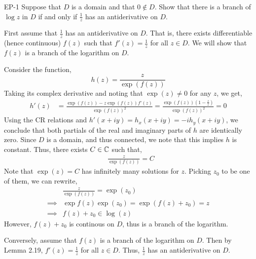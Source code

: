 \documentclass[12pt]{amsart}
\begin{document}



\begin{problem}{EP-1}
    Suppose that $D$ is a domain and that $0 \not \in D$. Show that there is a branch of $\log z$ in $D$ if and only if $\frac{1}{z}$ has an antiderivative on $D$. 
\end{problem}
\begin{solution}
    First assume that $\frac{1}{z}$ has an antiderivative on $D$. That is, there exists differentiable (hence continuous) $f(z)$ such that $f'(z) = \frac{1}{z}$ for all $z \in D$. We will show that $f(z)$ is a branch of the logarithm on $D$. 
    
    Consider the function,
    \[ h(z) = \frac{z}{\exp(f(z))}\]
    Taking its complex derivative and noting that $\exp(z) \neq 0$ for any $z$,  we get, 
    \begin{align*}
        h'(z) &= \frac{\exp(f(z)) -z\exp(f(z))f'(z)}{\exp(f(z))^2} = \frac{\exp(f(z))\left(1-\frac{z}{z}\right)}{\exp(f(z))^2} = 0 
    \end{align*}
    Using the CR relations and $h'(x+iy) = h_x(x+iy) = -ih_y(x+iy)$, we conclude that both partials of the real and imaginary parts of $h$ are identically zero. Since $D$ is a domain, and thus connected, we note that this implies $h$ is constant. Thus, there exists $C \in \mathbb C$ such that, 
    \begin{align*}
        &\frac{z}{\exp(f(z))} = C
    \end{align*} 
    Note that $\exp(z) = C$ has infinitely many solutions for $z$. Picking $z_0$ to be one of them, we can rewrite, 
    \begin{align*}
        &\frac{z}{\exp(f(z))} = \exp(z_0) \\
        \implies &\exp{f(z)}\exp(z_0) = \exp(f(z)+z_0) = z \\
        \implies &f(z)+z_0 \in \log(z)
    \end{align*}
    However, $f(z) + z_0$ is continous on $D$, thus is a branch of the logarithm. 

    Conversely, assume that $f(z)$ is a branch of the logarithm on $D$. Then by Lemma 2.19, $f'(z) = \frac{1}{z}$ for all $z \in D$. Thus, $\frac{1}{z}$ has an antiderivative on $D$.
\end{solution}
\newpage
\end{document}
